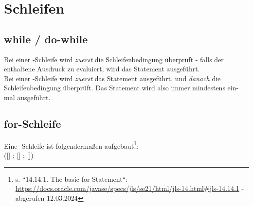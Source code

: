\section{Schleifen}

\subsection{while / do-while}
Bei einer -Schleife wird \textit{zuerst} die Schleifenbedingung überprüft - falls der enthaltene Ausdruck zu  evaluiert, wird das Statement ausgeführt.\\

\noindent
Bei einer -Schleife wird \textit{zuerst} das Statement ausgeführt, und \textit{danach} die Schleifenbedingung überprüft.
Das Statement wird also immer mindestens ein-mal ausgeführt.\\

\subsection{for-Schleife}

Eine -Schleife ist folgendermaßen aufgebaut\footnote{
s. ``14.14.1. The basic for Statement``: \url{https://docs.oracle.com/javase/specs/jls/se21/html/jls-14.html#jls-14.14.1} - abgerufen 12.03.2024
}:\\

\noindent
{} ([] ; [] ; []) \\


